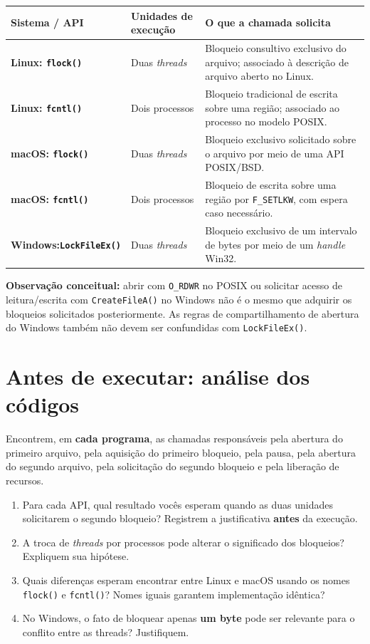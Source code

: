 \documentclass[11pt,a4paper]{article}
\begin{document}
\renewcommand{\arraystretch}{1.18}
\begin{tabularx}{\textwidth}{>{\bfseries}p{2.55cm}p{2.85cm}X}
\toprule
Sistema / API & Unidades de execução & O que a chamada solicita\\
\midrule
Linux: \texttt{flock()} & Duas \textit{threads} & Bloqueio consultivo exclusivo do arquivo; associado à descrição de arquivo aberto no Linux.\\
Linux: \texttt{fcntl()} & Dois processos & Bloqueio tradicional de escrita sobre uma região; associado ao processo no modelo POSIX.\\
macOS: \texttt{flock()} & Duas \textit{threads} & Bloqueio exclusivo solicitado sobre o arquivo por meio de uma API POSIX/BSD.\\
macOS: \texttt{fcntl()} & Dois processos & Bloqueio de escrita sobre uma região por \texttt{F\_SETLKW}, com espera caso necessário.\\
Windows:\newline \texttt{LockFileEx()} & Duas \textit{threads} & Bloqueio exclusivo de um intervalo de bytes por meio de um \textit{handle} Win32.\\
\bottomrule
\end{tabularx}

\textbf{Observação conceitual:} abrir com \texttt{O\_RDWR} no POSIX ou solicitar acesso de leitura/escrita com \texttt{CreateFileA()} no Windows não é o mesmo que adquirir os bloqueios solicitados posteriormente. As regras de compartilhamento de abertura do Windows também não devem ser confundidas com \texttt{LockFileEx()}.

\newpage
\section{Antes de executar: análise dos códigos}
Encontrem, em \textbf{cada programa}, as chamadas responsáveis pela abertura do primeiro arquivo, pela aquisição do primeiro bloqueio, pela pausa, pela abertura do segundo arquivo, pela solicitação do segundo bloqueio e pela liberação de recursos.

\begin{enumerate}[label=H\arabic*.]
\item Para cada API, qual resultado vocês esperam quando as duas unidades solicitarem o segundo bloqueio? Registrem a justificativa \textbf{antes} da execução.
\item A troca de \textit{threads} por processos pode alterar o significado dos bloqueios? Expliquem sua hipótese.
\item Quais diferenças esperam encontrar entre Linux e macOS usando os nomes \texttt{flock()} e \texttt{fcntl()}? Nomes iguais garantem implementação idêntica?
\item No Windows, o fato de bloquear apenas \textbf{um byte} pode ser relevante para o conflito entre as threads? Justifiquem.
\end{enumerate}
\end{document}
